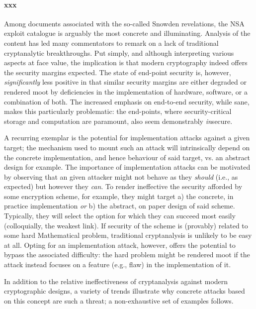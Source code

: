 
\paragraph{xxx}

Among documents associated with the so-called Snowden revelations, the NSA 
exploit catalogue is arguably the most concrete and illuminating.  Analysis
of the content has led many commentators to remark on a lack of traditional
cryptanalytic breakthroughs.  Put simply, and although interpreting various
aspects at face value, the implication is that modern cryptography indeed
offers the security margins expected.  The state of end-point security is, 
however, {\em significantly} less positive in that similar security margins
are either degraded or rendered moot by deficiencies in the implementation 
of hardware, software, or a combination of both.  The increased emphasis on
end-to-end security, while sane, makes this particularly problematic: the
end-points, where security-critical storage and computation are paramount,
also seem demonstrably {\em in}secure.

A recurring exemplar is the potential for implementation attacks against a
given target; the mechanism used to mount such an attack will intrinsically
depend on the concrete implementation, and hence behaviour of said target,
vs. an abstract design for example.
The importance of implementation attacks can be motivated by observing that
an given attacker might not behave as they {\em should} (i.e., as expected)
but however they {\em can}.  To render ineffective the security afforded by
some encryption scheme, for example, they might target
a) the concrete, in practice implementation
   {\em or}
b) the abstract, on paper    design
of said scheme.  Typically, they will select the option for which they can
succeed most easily (colloquially, the weakest link).  If security of the
scheme is (provably) related to some hard Mathematical problem, traditional
cryptanalysis is unlikely to be easy at all.  Opting for an implementation
attack, however, offers the potential to bypass the associated difficulty:
the hard problem might be rendered moot if the attack instead focuses on a
feature (e.g., flaw) in the implementation of it.

In addition to the relative ineffectiveness of cryptanalysis against modern
cryptographic designs, a variety of trends illustrate why concrete attacks
based on this concept are such a threat; a non-exhaustive set of examples
follows.

